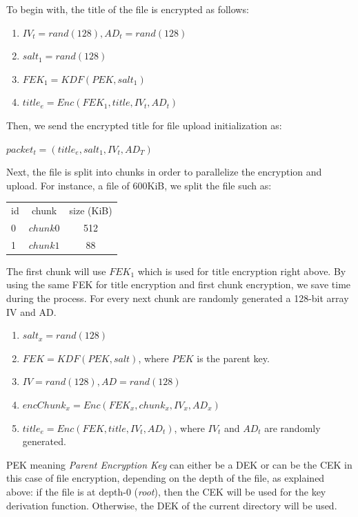 \documentclass[a4paper,9pt,twoside]{article}
\begin{document}
To begin with, the title of the file is encrypted as follows:

\begin{enumerate}
\itemsep0em
\item $IV_t=rand(128), AD_t=rand(128)$
\item $salt_1=rand(128)$
\item $FEK_1=KDF(PEK, salt_1)$
\item $title_e=Enc(FEK_1, title, IV_t, AD_t)$
\end{enumerate}

Then, we send the encrypted title for file upload initialization as:

\begin{center}
$packet_t=(title_e, salt_1, IV_t, AD_T)$
\end{center}

Next, the file is split into chunks in order to parallelize the 
encryption and upload. For instance, a file of 600KiB, we
split the file such as:

\begin{center}
\begin{tabular}{ l | c | c }
  \hline
  id & chunk & size (KiB) \\
  0 & $chunk0$ & 512 \\
  1 & $chunk1$ & 88 \\
  \hline
\end{tabular}
\end{center}

    The first chunk will use $FEK_1$ which is used for title encryption 
    right above. By using the same FEK for title encryption and first chunk 
    encryption, we save time during the process. 
    For every next chunk are randomly generated a 128-bit array IV and AD.

\begin{enumerate}
\itemsep0em
\item $salt_x=rand(128)$
\item $FEK=KDF(PEK, salt)$, where $PEK$ is the parent key.
\item $IV=rand(128), AD=rand(128)$
\item $encChunk_x=Enc(FEK_x, chunk_x, IV_x, AD_x)$
\item $title_e=Enc(FEK, title, IV_t, AD_t)$, where $IV_t$ and $AD_t$ are randomly generated.
\end{enumerate}

    PEK meaning \emph{Parent Encryption Key} can either be a DEK or 
can be the CEK in this case of file encryption, depending on the depth of the 
file, as explained above: if the file is at depth-0 (\emph{root}), then the CEK will be used for the key derivation function. 
Otherwise, the DEK of the current directory will be used.
\end{document}
